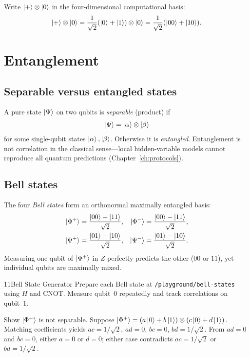 \begin{example}
Write $\ket{+}\otimes\ket{0}$ in the four-dimensional computational basis:
\[
\ket{+}\otimes\ket{0}=\frac{1}{\sqrt{2}}(\ket{0}+\ket{1})\otimes\ket{0}
=\frac{1}{\sqrt{2}}(\ket{00}+\ket{10}).
\]
\end{example}

\section{Entanglement}
\label{sec:entanglement}

\subsection{Separable versus entangled states}

A pure state $\ket{\Psi}$ on two qubits is \emph{separable} (product) if
\begin{equation}
\ket{\Psi}=\ket{\alpha}\otimes\ket{\beta}
\label{eq:separable}
\end{equation}
for some single-qubit states $\ket{\alpha},\ket{\beta}$. Otherwise it is \emph{entangled}. Entanglement is not correlation in the classical sense---local hidden-variable models cannot reproduce all quantum predictions (Chapter~\ref{ch:protocols}).

\subsection{Bell states}

The four \emph{Bell states} form an orthonormal maximally entangled basis:
\begin{align}
\ket{\Phi^+}&=\frac{\ket{00}+\ket{11}}{\sqrt{2}}, &
\ket{\Phi^-}&=\frac{\ket{00}-\ket{11}}{\sqrt{2}}, \\
\ket{\Psi^+}&=\frac{\ket{01}+\ket{10}}{\sqrt{2}}, &
\ket{\Psi^-}&=\frac{\ket{01}-\ket{10}}{\sqrt{2}}.
\label{eq:bell-states}
\end{align}
Measuring one qubit of $\ket{\Phi^+}$ in $Z$ perfectly predicts the other ($00$ or $11$), yet individual qubits are maximally mixed.

\begin{labbox}{11}{Bell State Generator}
Prepare each Bell state at \texttt{/playground/bell-states} using $H$ and CNOT. Measure qubit~0 repeatedly and track correlations on qubit~1.
\end{labbox}

\begin{example}
Show $\ket{\Phi^+}$ is not separable. Suppose $\ket{\Phi^+}=(a\ket{0}+b\ket{1})\otimes(c\ket{0}+d\ket{1})$. Matching coefficients yields $ac=1/\sqrt{2}$, $ad=0$, $bc=0$, $bd=1/\sqrt{2}$. From $ad=0$ and $bc=0$, either $a=0$ or $d=0$; either case contradicts $ac=1/\sqrt{2}$ or $bd=1/\sqrt{2}$.
\end{example}

